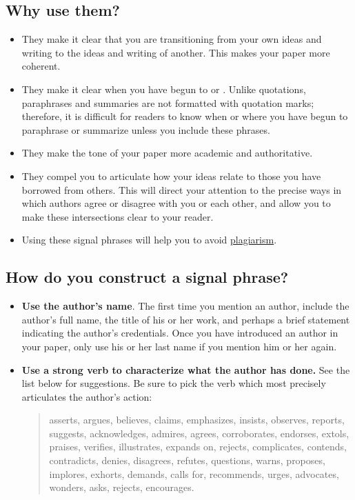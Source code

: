 \subsection{Why use them?}
 \begin{itemize}

\item They make it clear that you are transitioning from your own ideas and
writing to the ideas and writing of another. This makes your paper more
coherent.

\item They make it clear when you have begun to \hyperlink{paraphrase}{\color{Ahrenge}{paraphrase}} or \hyperlink{summary}{\color{Ahrenge}{summarize}}.
Unlike quotations, paraphrases and summaries are not formatted with quotation
marks; therefore, it is difficult for readers to know when or where you have
begun to paraphrase or summarize unless you include these phrases.

\item They make the tone of your paper more academic and authoritative.

\item They compel you to articulate how your ideas relate to those you
have borrowed from others. This will direct your attention to the precise
ways in which authors agree or disagree with you or each other, and allow
you to make these intersections clear to your reader.

\item Using these signal phrases will help you to avoid \hyperlink{plagiarism}{\color{Ahrenge}plagiarism}.
 \end{itemize}

\subsection{How do you construct a signal phrase?}

\begin{itemize}
\item \textbf{Use the author's name}. The first time you mention an author,
include the
author's full name, the title of his or her work, and perhaps a brief
statement indicating the
author's credentials. Once you have introduced an author in your paper,
only use his or
her last name if you mention him or her again.

\item \textbf{Use a strong verb to characterize what the author has done.} See the list
below for suggestions. Be sure to pick the verb which most precisely
articulates the
author's action:

\begin{quote}
asserts, argues, believes, claims, emphasizes, insists, observes, reports,
suggests, acknowledges, admires, agrees, corroborates, endorses, extols,
praises, verifies, illustrates, expands on, rejects, complicates, contends, contradicts,
denies, disagrees, refutes, questions, warns, proposes, implores, exhorts, demands,
calls for, recommends, urges, advocates, wonders, asks, rejects, encourages.
\end{quote}

\end{itemize}

